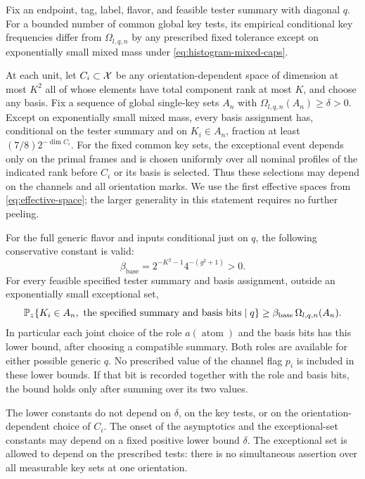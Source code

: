 \begin{lemma}
\label{lem:unary-positivity}
Fix an endpoint, tag, label, flavor, and feasible tester summary with
diagonal $q$. For a bounded number of common global key tests, its
empirical conditional key frequencies differ from
$\Omega_{l,q,n}$ by any prescribed fixed tolerance except on
exponentially small mixed mass under
\eqref{eq:histogram-mixed-caps}.

At each unit, let $C_i\subset\mathcal X$ be any orientation-dependent space
of dimension at most $K^2$ all of whose elements have total component
rank at most $K$, and choose any basis. Fix a sequence of global
single-key sets $A_n$ with
$\Omega_{l,q,n}(A_n)\ge\delta>0$. Except on exponentially small mixed
mass, every basis assignment has, conditional on the tester summary
and on $K_i\in A_n$, fraction at least
$(7/8)2^{-\dim C_i}$.
For the fixed common key sets, the exceptional event depends only on
the primal frames and is chosen uniformly over all nominal profiles
of the indicated rank before $C_i$ or its basis is selected. Thus
these selections may depend on the channels and all orientation
marks. We use the first effective spaces from
\eqref{eq:effective-space}; the larger generality in this statement
requires no further peeling.

For the full generic flavor and inputs conditional just on $q$, the
following conservative constant is valid:
\begin{equation}\label{eq:uniform-base-fraction}
 \beta_{\mathrm{base}}=2^{-K^2-1}4^{-(g^2+1)}>0.
\end{equation}
For every feasible specified tester summary and basis assignment,
outside an exponentially small exceptional set,
\begin{equation}\label{eq:histogram-base-cell-lower}
 \mathbb P_z\{K_i\in A_n,\ \text{the specified summary and basis bits}\mid q\}
 \ge\beta_{\mathrm{base}}\,\Omega_{l,q,n}(A_n).
\end{equation}
In particular each joint choice of the role $a(\operatorname{atom})$
and the basis bits has this lower bound, after choosing a compatible
summary. Both roles are available for either possible generic $q$.
No prescribed value of the channel flag $p_i$ is included in these
lower bounds. If that bit is recorded together with the role and
basis bits, the bound holds only after summing over its two values.

The lower constants do not depend on $\delta$, on the key tests, or on
the orientation-dependent choice of $C_i$. The onset of the
asymptotics and the exceptional-set constants may depend on a fixed
positive lower bound $\delta$. The exceptional set is allowed to
depend on the prescribed tests: there is no simultaneous assertion
over all measurable key sets at one orientation.
\end{lemma}

